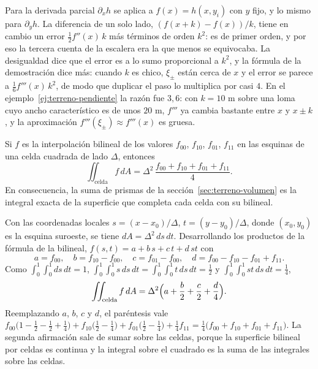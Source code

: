 Para la derivada parcial \(\partial_xh\) se aplica a \(f(x)=h(x,y_i)\) con \(y\) fijo, y lo mismo
para \(\partial_yh\). La diferencia de un solo lado, \((f(x+k)-f(x))/k\), tiene en cambio un error
\(\tfrac12f''(x)\,k\) más términos de orden \(k^2\): es de primer orden, y por eso la tercera cuenta
de la escalera era la que menos se equivocaba. La desigualdad dice que el error es a lo sumo
proporcional a \(k^2\), y la fórmula de la demostración dice más: cuando \(k\) es chico, \(\xi_\pm\)
están cerca de \(x\) y el error se parece a \(\tfrac16f'''(x)\,k^2\), de modo que duplicar el paso
lo multiplica por casi \(4\). En el ejemplo~\ref{ej:terreno-pendiente} la razón fue \(3{,}6\): con
\(k=10\) m sobre una loma cuyo ancho característico es de unos \(20\) m, \(f'''\) ya cambia bastante
entre \(x\) y \(x\pm k\), y la aproximación \(f'''(\xi_\pm)\approx f'''(x)\) es gruesa.

\begin{proposicion}\label{prop:terreno-prisma}
Si \(f\) es la interpolación bilineal de los valores \(f_{00}\), \(f_{10}\), \(f_{01}\), \(f_{11}\) en
las esquinas de una celda cuadrada de lado \(\Delta\), entonces
\[
  \iint_{\text{celda}}f\,dA=\Delta^2\,\frac{f_{00}+f_{10}+f_{01}+f_{11}}{4}.
\]
En consecuencia, la suma de prismas de la sección~\ref{sec:terreno-volumen} es la integral exacta de
la superficie que completa cada celda con su bilineal.
\end{proposicion}

\begin{demostracion}
Con las coordenadas locales \(s=(x-x_0)/\Delta\), \(t=(y-y_0)/\Delta\), donde \((x_0,y_0)\) es la
esquina suroeste, se tiene \(dA=\Delta^2\,ds\,dt\). Desarrollando los productos de la fórmula de
la bilineal, \(f(s,t)=a+b\,s+c\,t+d\,st\) con
\[
  a=f_{00},\quad b=f_{10}-f_{00},\quad c=f_{01}-f_{00},\quad d=f_{00}-f_{10}-f_{01}+f_{11}.
\]
Como \(\int_0^1\!\int_0^1 ds\,dt=1\), \(\int_0^1\!\int_0^1 s\,ds\,dt=\int_0^1\!\int_0^1 t\,ds\,dt=\tfrac12\) y
\(\int_0^1\!\int_0^1 st\,ds\,dt=\tfrac14\),
\[
  \iint_{\text{celda}}f\,dA=\Delta^2\Bigl(a+\frac b2+\frac c2+\frac d4\Bigr).
\]
Reemplazando \(a\), \(b\), \(c\) y \(d\), el paréntesis vale
\(f_{00}\bigl(1-\tfrac12-\tfrac12+\tfrac14\bigr)+f_{10}\bigl(\tfrac12-\tfrac14\bigr)+f_{01}\bigl(\tfrac12-\tfrac14\bigr)+\tfrac14f_{11}
=\tfrac14\bigl(f_{00}+f_{10}+f_{01}+f_{11}\bigr)\). La segunda afirmación sale de sumar sobre las
celdas, porque la superficie bilineal por celdas es continua y la integral sobre el cuadrado es
la suma de las integrales sobre las celdas.
\end{demostracion}


